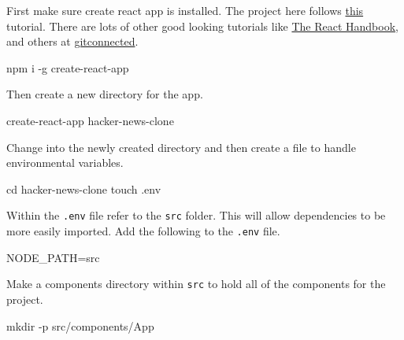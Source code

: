 \documentclass[]{book}
\newenvironment{Shaded}{\begin{snugshade}}{\end{snugshade}}
\newcommand{\FunctionTok}[1]{\textcolor[rgb]{0.00,0.00,0.00}{#1}}
\newcommand{\VariableTok}[1]{\textcolor[rgb]{0.00,0.00,0.00}{#1}}
\newcommand{\BuiltInTok}[1]{#1}
\newcommand{\ExtensionTok}[1]{#1}
\newcommand{\NormalTok}[1]{#1}
\begin{document}
First make sure create react app is installed. The project here follows
\href{https://www.youtube.com/watch?v=oGB_VPrld0U\&list=PLTTC1K14KAxHj6AftnRUD28SQaoVauvl3}{this}
tutorial. There are lots of other good looking tutorials like
\href{https://www.freecodecamp.org/news/the-react-handbook-b71c27b0a795/}{The
React Handbook}, and others at
\href{https://gitconnected.com/learn/react}{gitconnected}.

\begin{Shaded}
\begin{Highlighting}[]
\ExtensionTok{npm}\NormalTok{ i -g create-react-app}
\end{Highlighting}
\end{Shaded}

Then create a new directory for the app.

\begin{Shaded}
\begin{Highlighting}[]
\ExtensionTok{create-react-app}\NormalTok{ hacker-news-clone}
\end{Highlighting}
\end{Shaded}

Change into the newly created directory and then create a file to handle
environmental variables.

\begin{Shaded}
\begin{Highlighting}[]
\BuiltInTok{cd}\NormalTok{ hacker-news-clone}
\FunctionTok{touch}\NormalTok{ .env}
\end{Highlighting}
\end{Shaded}

Within the \texttt{.env} file refer to the \texttt{src} folder. This
will allow dependencies to be more easily imported. Add the following to
the \texttt{.env} file.

\begin{Shaded}
\begin{Highlighting}[]
\VariableTok{NODE_PATH=}\NormalTok{src}
\end{Highlighting}
\end{Shaded}

Make a components directory within \texttt{src} to hold all of the
components for the project.

\begin{Shaded}
\begin{Highlighting}[]
\FunctionTok{mkdir}\NormalTok{ -p src/components/App}
\end{Highlighting}
\end{Shaded}
\end{document}
